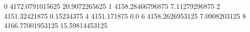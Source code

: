0 4172.0791015625 20.9072265625
1 4158.28466796875 7.11279296875
2 4151.32421875 0.15234375
4 4151.171875 0.0
6 4158.2626953125 7.0908203125
8 4166.77001953125 15.59814453125
